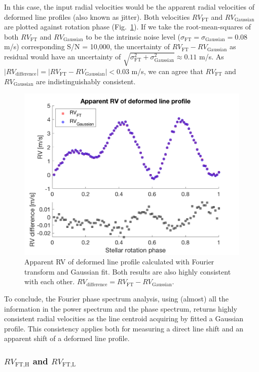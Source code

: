In this case, the input radial velocities would be the apparent radial velocities of deformed line profiles (also known as jitter). Both velocities $RV_\text{FT}$ and $RV_\text{Gaussian}$ are plotted against rotation phase (Fig.~\ref{fig:rv_recovery_deformed}). If we take the root-mean-squares of both $RV_\text{FT}$ and $RV_\text{Gaussian}$ to be the intrinsic noise level ($\sigma_\text{FT} = \sigma_\text{Gaussian} = 0.08$ m/s) corresponding S/N = 10,000, the uncertainty of $RV_\text{FT} - RV_\text{Gaussian}$ as residual would have an uncertainty of 
$\sqrt{\sigma_\text{FT}^2+\sigma_\text{Gaussian}^2}\approx0.11$ m/s. As $\mid RV_\text{difference}\mid = \mid RV_\text{FT} - RV_\text{Gaussian}\mid < 0.03$ m/s, we can agree that $RV_\text{FT}$ and $RV_\text{Gaussian}$ are indistinguishably consistent. 

\begin{figure}[tbp]
\centering
\includegraphics[width = 0.7 \linewidth]
{./Figures/Methods/5-JITTER_ONLY_3.png}
\caption[Apparent RV of deformed line profile]
{Apparent RV of deformed line profile calculated with Fourier transform and Gaussian fit. Both results are also highly consistent with each other. $RV_\text{difference} = RV_\text{FT} - RV_\text{Gaussian}$.}
\label{fig:rv_recovery_deformed}
\end{figure} 
\FloatBarrier

To conclude, the Fourier phase spectrum analysis, using (almost) all the information in the power spectrum and the phase spectrum, returns highly consistent radial velocities as the line centroid acquiring by fitted a Gaussian profile. This consistency applies both for measuring a direct line shift and an apparent shift of a deformed line profile. 

\subsubsection{$RV_\text{FT,H}$ and $RV_\text{FT,L}$}
\label{subsec:FT,HL}

